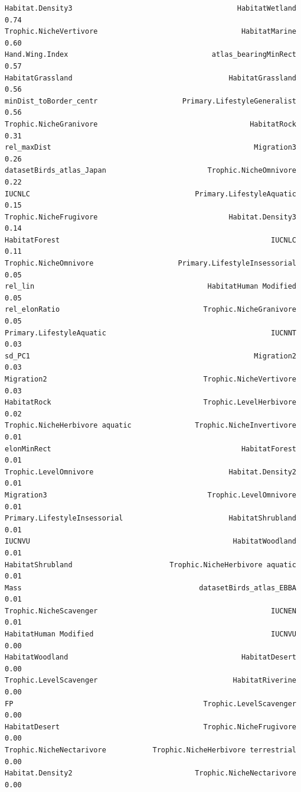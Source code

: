 \documentclass[
  letterpaper,
  DIV=11,
  numbers=noendperiod]{scrreprt}
\begin{document}
\begin{verbatim}
Habitat.Density3                                       HabitatWetland    0.74
Trophic.NicheVertivore                                  HabitatMarine    0.60
Hand.Wing.Index                                  atlas_bearingMinRect    0.57
HabitatGrassland                                     HabitatGrassland    0.56
minDist_toBorder_centr                    Primary.LifestyleGeneralist    0.56
Trophic.NicheGranivore                                    HabitatRock    0.31
rel_maxDist                                                Migration3    0.26
datasetBirds_atlas_Japan                        Trophic.NicheOmnivore    0.22
IUCNLC                                       Primary.LifestyleAquatic    0.15
Trophic.NicheFrugivore                               Habitat.Density3    0.14
HabitatForest                                                  IUCNLC    0.11
Trophic.NicheOmnivore                    Primary.LifestyleInsessorial    0.05
rel_lin                                         HabitatHuman Modified    0.05
rel_elonRatio                                  Trophic.NicheGranivore    0.05
Primary.LifestyleAquatic                                       IUCNNT    0.03
sd_PC1                                                     Migration2    0.03
Migration2                                     Trophic.NicheVertivore    0.03
HabitatRock                                    Trophic.LevelHerbivore    0.02
Trophic.NicheHerbivore aquatic               Trophic.NicheInvertivore    0.01
elonMinRect                                             HabitatForest    0.01
Trophic.LevelOmnivore                                Habitat.Density2    0.01
Migration3                                      Trophic.LevelOmnivore    0.01
Primary.LifestyleInsessorial                         HabitatShrubland    0.01
IUCNVU                                                HabitatWoodland    0.01
HabitatShrubland                       Trophic.NicheHerbivore aquatic    0.01
Mass                                          datasetBirds_atlas_EBBA    0.01
Trophic.NicheScavenger                                         IUCNEN    0.01
HabitatHuman Modified                                          IUCNVU    0.00
HabitatWoodland                                         HabitatDesert    0.00
Trophic.LevelScavenger                                HabitatRiverine    0.00
FP                                             Trophic.LevelScavenger    0.00
HabitatDesert                                  Trophic.NicheFrugivore    0.00
Trophic.NicheNectarivore           Trophic.NicheHerbivore terrestrial    0.00
Habitat.Density2                             Trophic.NicheNectarivore    0.00

\end{verbatim}
\end{document}
